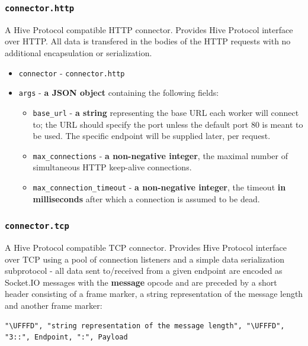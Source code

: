 \documentclass[a4paper]{article}
\begin{document}
\subsubsection{\texttt{connector.http}}
\label{sec-9-4-2}
\label{ref-cp_connectors}

A Hive Protocol compatible HTTP connector. Provides Hive Protocol interface over HTTP. All data is transfered in the bodies of the HTTP requests with no additional encapsulation or serialization.


\begin{itemize}
\item \texttt{connector} - \texttt{connector.http}
\item \texttt{args} - \textbf{a JSON object} containing the following fields:
\begin{itemize}
\item \texttt{base\_url} - \textbf{a string} representing the base URL each worker will connect to; the URL should specify the port unless the default port 80 is meant to be used. The specific endpoint will be supplied later, per request.
\item \texttt{max\_connections} - \textbf{a non-negative integer}, the maximal number of simultaneous HTTP keep-alive connections.
\item \texttt{max\_connection\_timeout} - \textbf{a non-negative integer}, the timeout \textbf{in milliseconds} after which a connection is assumed to be dead.
\end{itemize}
\end{itemize}
\subsubsection{\texttt{connector.tcp}}
\label{sec-9-4-3}

A Hive Protocol compatible TCP connector. Provides Hive Protocol interface over TCP using a pool of connection listeners and a simple data serialization subprotocol - all data sent to/received from a given endpoint are encoded as Socket.IO messages with the \textbf{message} opcode and are preceded by a short header consisting of a frame marker, a string representation of the message length and another frame marker:


\begin{verbatim}
"\UFFFD", "string representation of the message length", "\UFFFD", "3::", Endpoint, ":", Payload
\end{verbatim}
\end{document}
